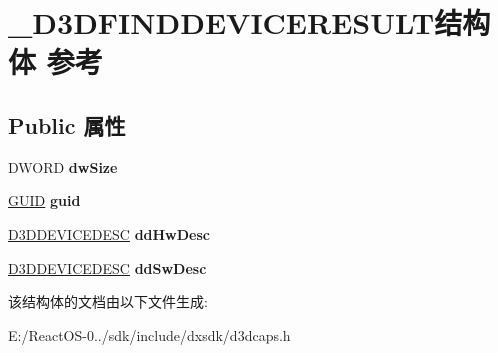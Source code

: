\hypertarget{struct___d3_d_f_i_n_d_d_e_v_i_c_e_r_e_s_u_l_t}{}\section{\+\_\+\+D3\+D\+F\+I\+N\+D\+D\+E\+V\+I\+C\+E\+R\+E\+S\+U\+L\+T结构体 参考}
\label{struct___d3_d_f_i_n_d_d_e_v_i_c_e_r_e_s_u_l_t}
\subsection*{Public 属性}
\begin{DoxyCompactItemize}
\item 
\mbox{\label{struct___d3_d_f_i_n_d_d_e_v_i_c_e_r_e_s_u_l_t_a2398f7c38454048ea99df6bc620eba67}} 
D\+W\+O\+RD {\bfseries dw\+Size}
\item 
\mbox{\label{struct___d3_d_f_i_n_d_d_e_v_i_c_e_r_e_s_u_l_t_a81e26047ecfe4f00a560ddea20d25b9f}} 
\hyperlink{interface_g_u_i_d}{G\+U\+ID} {\bfseries guid}
\item 
\mbox{\label{struct___d3_d_f_i_n_d_d_e_v_i_c_e_r_e_s_u_l_t_ae9a2f9a3c43d286d4f939127dc2141a2}} 
\hyperlink{struct___d3_d_device_desc}{D3\+D\+D\+E\+V\+I\+C\+E\+D\+E\+SC} {\bfseries dd\+Hw\+Desc}
\item 
\mbox{\label{struct___d3_d_f_i_n_d_d_e_v_i_c_e_r_e_s_u_l_t_ac92904e84dc42197b08327cadfc4acd0}} 
\hyperlink{struct___d3_d_device_desc}{D3\+D\+D\+E\+V\+I\+C\+E\+D\+E\+SC} {\bfseries dd\+Sw\+Desc}
\end{DoxyCompactItemize}


该结构体的文档由以下文件生成\+:\begin{DoxyCompactItemize}
\item 
E\+:/\+React\+O\+S-\/0../sdk/include/dxsdk/d3dcaps.\+h\end{DoxyCompactItemize}
